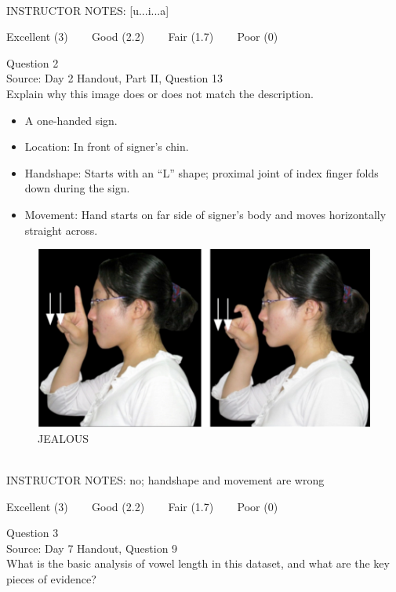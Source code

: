 \documentclass[12pt]{article}
\begin{document}
~\\
INSTRUCTOR NOTES: [u...i...a]


\vfill
Excellent (3) ~~~ Good (2.2) ~~~ Fair (1.7) ~~~ Poor (0)
\newpage

{\large Question 2}\\

Source: Day 2 Handout, Part II, Question 13\\

Explain why this image does or does not match the description.\\

\begin{itemize} \item A one-handed sign. \item Location: In front of signer’s chin. \item Handshape: Starts with an “L” shape; proximal joint of index finger folds down during the sign. \item Movement: Hand starts on far side of signer’s body and moves horizontally straight across. \end{itemize}

\begin{figure}[H]
\includegraphics{../images/taiwansign_jealous.png}
\caption{JEALOUS}
\end{figure}

~\\
INSTRUCTOR NOTES: no; handshape and movement are wrong


\vfill
Excellent (3) ~~~ Good (2.2) ~~~ Fair (1.7) ~~~ Poor (0)
\newpage

{\large Question 3}\\

Source: Day 7 Handout, Question 9\\

What is the basic analysis of vowel length in this dataset, and what are the key pieces of evidence?\\
\end{document}
